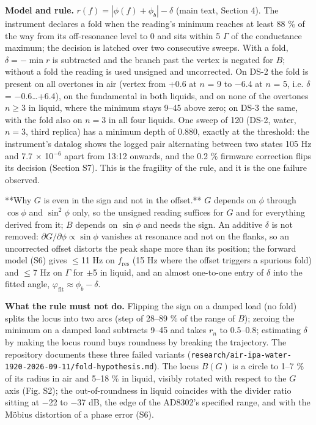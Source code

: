\documentclass[11pt,a4paper]{article}
\begin{document}
\textbf{Model and rule.} $r(f) = |\phi(f) + \phi_b| - \delta$ (main text, Section 4). The instrument declares a fold when the reading's minimum reaches at least 88 \% of the way from its off-resonance level to 0\textdegree{} and sits within 5 $\Gamma$ of the conductance maximum; the decision is latched over two consecutive sweeps. With a fold, $\delta = -\min r$ is subtracted and the branch past the vertex is negated for $B$; without a fold the reading is used unsigned and uncorrected. On DS-2 the fold is present on all overtones in air (vertex from +0.6\textdegree{} at $n$ = 9 to $-$6.4\textdegree{} at $n$ = 5, i.e. $\delta$ = $-$0.6\ldots{}+6.4\textdegree{}), on the fundamental in both liquids, and on none of the overtones $n \ge 3$ in liquid, where the minimum stays 9--45\textdegree{} above zero; on DS-3 the same, with the fold also on $n = 3$ in all four liquids. One sweep of 120 (DS-2, water, $n = 3$, third replica) has a minimum depth of 0.880, exactly at the threshold: the instrument's datalog shows the logged pair alternating between two states 105 Hz and 7.7 $\times$ 10$^{-6}$ apart from 13:12 onwards, and the 0.2 \% firmware correction flips its decision (Section S7). This is the fragility of the rule, and it is the one failure observed.

**Why $G$ is even in the sign and not in the offset.** $G$ depends on $\phi$ through $\cos\phi$ and $\sin^2\phi$ only, so the unsigned reading suffices for $G$ and for everything derived from it; $B$ depends on $\sin\phi$ and needs the sign. An additive $\delta$ is not removed: $\partial G/\partial\phi \propto \sin\phi$ vanishes at resonance and not on the flanks, so an uncorrected offset distorts the peak shape more than its position; the forward model (S6) gives $\le$11 Hz on $f_\mathrm{res}$ (15 Hz where the offset triggers a spurious fold) and $\le$7 Hz on $\Gamma$ for $\pm$5\textdegree{} in liquid, and an almost one-to-one entry of $\delta$ into the fitted angle, $\varphi_\mathrm{fit} \approx \phi_b - \delta$.

\textbf{What the rule must not do.} Flipping the sign on a damped load (no fold) splits the locus into two arcs (step of 28--89 \% of the range of $B$); zeroing the minimum on a damped load subtracts 9--45\textdegree{} and takes $r_n$ to 0.5--0.8; estimating $\delta$ by making the locus round buys roundness by breaking the trajectory. The repository documents these three failed variants (\texttt{research/air-ipa-water-1920-2026-09-11/fold-hypothesis.md}). The locus $B(G)$ is a circle to 1--7 \% of its radius in air and 5--18 \% in liquid, visibly rotated with respect to the $G$ axis (Fig. S2); the out-of-roundness in liquid coincides with the divider ratio sitting at $-$22 to $-$37 dB, the edge of the AD8302's specified range, and with the Möbius distortion of a phase error (S6).
\end{document}
